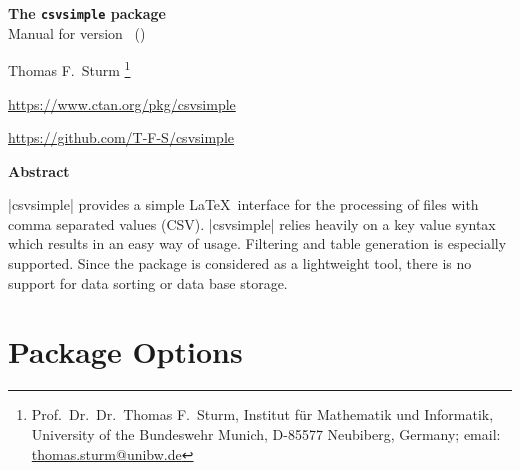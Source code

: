 \documentclass[a4paper,11pt]{ltxdoc}
\begin{document}
\begin{center}
\begin{tcolorbox}[enhanced,hbox,tikznode,left=8mm,right=8mm,boxrule=0.4pt,
  colback=white,colframe=black!50!yellow,
  drop lifted shadow=black!50!yellow,arc is angular,
  before=\par\vspace*{5mm},after=\par\bigskip]
{\bfseries\LARGE The \texttt{csvsimple} package}\\[3mm]
{\large Manual for version \version\ (\datum)}
\end{tcolorbox}
{\large Thomas F.~Sturm%
  \footnote{Prof.~Dr.~Dr.~Thomas F.~Sturm, Institut f\"{u}r Mathematik und Informatik,
    University of the Bundeswehr Munich, D-85577 Neubiberg, Germany;
     email: \href{mailto:thomas.sturm@unibw.de}{thomas.sturm@unibw.de}}\par\medskip
\normalsize\url{https://www.ctan.org/pkg/csvsimple}\par
\url{https://github.com/T-F-S/csvsimple}
}
\end{center}
\bigskip
\begin{absquote}
  \begin{center}\bfseries Abstract\end{center}
  |csvsimple| provides a simple \LaTeX\ interface for the processing of files with
  comma separated values (CSV). |csvsimple| relies heavily on a key value
  syntax which results in an easy way of usage.
  Filtering and table generation is especially supported. Since the package
  is considered as a lightweight tool, there is no support for data sorting
  or data base storage.
\end{absquote}

\section{Package Options}%
\end{document}
